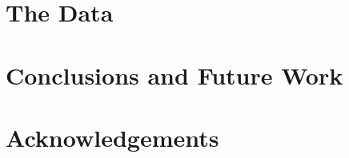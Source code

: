 \documentclass[letterpaper]{article} %
\begin{document}





\section{The Data}


\section{Conclusions and Future Work}

\section{Acknowledgements}




\end{document}
